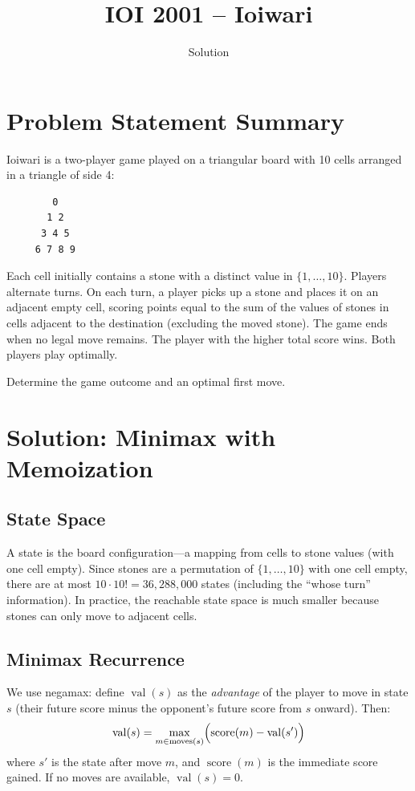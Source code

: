 \documentclass[11pt,a4paper]{article}
\title{IOI 2001 -- Ioiwari}
\author{Solution}
\date{}
\begin{document}
\maketitle

\section{Problem Statement Summary}
Ioiwari is a two-player game played on a triangular board with 10 cells
arranged in a triangle of side 4:
\begin{verbatim}
        0
       1 2
      3 4 5
     6 7 8 9
\end{verbatim}
Each cell initially contains a stone with a distinct value in $\{1,\ldots,10\}$.
Players alternate turns. On each turn, a player picks up a stone and
places it on an adjacent empty cell, scoring points equal to the sum of
the values of stones in cells adjacent to the destination (excluding the
moved stone). The game ends when no legal move remains. The player with
the higher total score wins. Both players play optimally.

Determine the game outcome and an optimal first move.

\section{Solution: Minimax with Memoization}

\subsection{State Space}
A state is the board configuration---a mapping from cells to stone values
(with one cell empty). Since stones are a permutation of $\{1,\ldots,10\}$
with one cell empty, there are at most $10 \cdot 10! = 36{,}288{,}000$
states (including the ``whose turn'' information). In practice, the
reachable state space is much smaller because stones can only move to
adjacent cells.

\subsection{Minimax Recurrence}
We use negamax: define $\operatorname{val}(s)$ as the \emph{advantage}
of the player to move in state $s$ (their future score minus the
opponent's future score from $s$ onward). Then:
\[
  \operatorname{val}(s) = \max_{m \in \text{moves}(s)}
  \Bigl(\operatorname{score}(m) - \operatorname{val}(s')\Bigr)
\]
where $s'$ is the state after move $m$, and $\operatorname{score}(m)$ is
the immediate score gained. If no moves are available,
$\operatorname{val}(s) = 0$.
\end{document}

